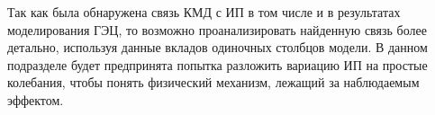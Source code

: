 
Так как была обнаружена связь КМД с ИП в том числе и в результатах моделирования ГЭЦ, то возможно проанализировать найденную связь более детально, используя данные вкладов одиночных столбцов модели. В данном подразделе будет предпринята попытка разложить вариацию ИП на простые колебания, чтобы понять физический механизм, лежащий за наблюдаемым эффектом.